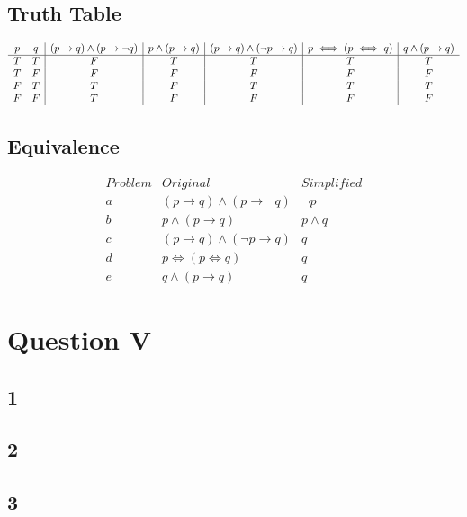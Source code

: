 \documentclass{article}
\begin{document}
\subsection*{Truth Table}
\begin{displaymath}
\begin{array}{c c|c|c|c|c|c} %
p & q & 
(p \rightarrow q) \land (p \rightarrow \neg q) & 
p \land (p \rightarrow q) & 
(p \rightarrow q) \land (\neg p \rightarrow q) &
p \iff (p \iff q) &
q \land (p \rightarrow q)
\\ 
\hline
T & T & F & T & T & T & T \\
T & F & F & F & F & F & F \\
F & T & T & F & T & T & T \\
F & F & T & F & F & F & F 
\end{array}
\end{displaymath}

\subsection*{Equivalence}
\begin{displaymath}
\begin{array}{c|c|c} %
Problem & Original & Simplified \\
\hline
a & (p \rightarrow q) \land (p \rightarrow \neg q) & \neg p \\ 
b & p \land (p \rightarrow q) & p \land q \\
c & (p \rightarrow q) \land (\neg p \rightarrow q) & q \\
d & p \iff (p \iff q) & q \\
e & q \land (p \rightarrow q) & q
\end{array}
\end{displaymath}

\section*{Question V}

\subsection{1}

\subsection{2}

\subsection{3}
\end{document}
